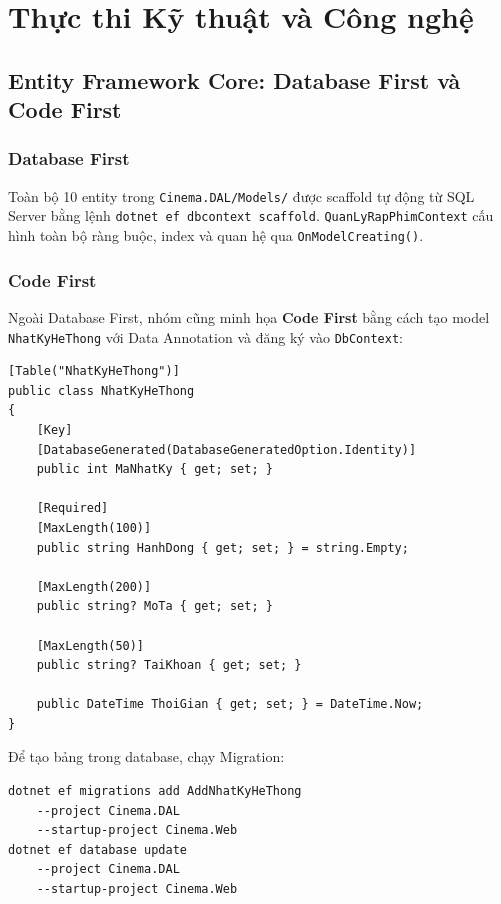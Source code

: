 \documentclass[12pt,a4paper,oneside]{book}
\theoremstyle{plain}
\numberwithin{equation}{chapter}
\begin{document}
\chapter{Thực thi Kỹ thuật và Công nghệ}

\section{Entity Framework Core: Database First và Code First}\label{Sec4.1}

\subsection{Database First}\label{sub4.1.1}

\noindent Toàn bộ 10 entity trong \texttt{Cinema.DAL/Models/} được scaffold tự động từ SQL Server bằng lệnh \texttt{dotnet ef dbcontext scaffold}. \texttt{QuanLyRapPhimContext} cấu hình toàn bộ ràng buộc, index và quan hệ qua \texttt{OnModelCreating()}.

\subsection{Code First}\label{sub4.1.2}

\noindent Ngoài Database First, nhóm cũng minh họa \textbf{Code First} bằng cách tạo model \texttt{NhatKyHeThong} với Data Annotation và đăng ký vào \texttt{DbContext}:

\begin{lstlisting}[style=csharpstyle, caption={Model Code First -- \texttt{NhatKyHeThong.cs}}]
[Table("NhatKyHeThong")]
public class NhatKyHeThong
{
    [Key]
    [DatabaseGenerated(DatabaseGeneratedOption.Identity)]
    public int MaNhatKy { get; set; }

    [Required]
    [MaxLength(100)]
    public string HanhDong { get; set; } = string.Empty;

    [MaxLength(200)]
    public string? MoTa { get; set; }

    [MaxLength(50)]
    public string? TaiKhoan { get; set; }

    public DateTime ThoiGian { get; set; } = DateTime.Now;
}
\end{lstlisting}

\noindent Để tạo bảng trong database, chạy Migration:
\begin{lstlisting}[style=sqlstyle, caption={Lệnh Migration Code First}]
dotnet ef migrations add AddNhatKyHeThong 
    --project Cinema.DAL 
    --startup-project Cinema.Web
dotnet ef database update 
    --project Cinema.DAL 
    --startup-project Cinema.Web
\end{lstlisting}
\end{document}
